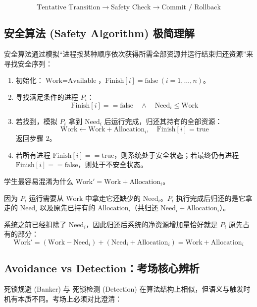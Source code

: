 \documentclass[11pt,a4paper]{ctexart}
\begin{document}
\[
\boxed{
\text{Tentative Transition}
\rightarrow
\text{Safety Check}
\rightarrow
\text{Commit / Rollback}
}
\]

\subsection{安全算法 (Safety Algorithm) 极简理解}

安全算法通过模拟“进程按某种顺序依次获得所需全部资源并运行结束归还资源”来寻找安全序列：

\begin{enumerate}
\item 初始化：$\text{Work} = \text{Available}$，$\text{Finish}[i] = \text{false} \ (i=1,\dots,n)$。
\item 寻找满足条件的进程 $P_i$：
\[
\text{Finish}[i] == \text{false} \quad \land \quad \text{Need}_i \le \text{Work}
\]
\item 若找到，模拟 $P_i$ 拿到 $\text{Need}_i$ 后运行完成，归还其持有的全部资源：
\[
\text{Work} \leftarrow \text{Work} + \text{Allocation}_i, \quad \text{Finish}[i] = \text{true}
\]
返回步骤 2。
\item 若所有进程 $\text{Finish}[i] == \text{true}$，则系统处于安全状态；若最终仍有进程 $\text{Finish}[i] == \text{false}$，则处于不安全状态。
\end{enumerate}

\begin{corebox}
学生最容易混淆为什么 $\text{Work}' = \text{Work} + \text{Allocation}_i$。

因为 $P_i$ 运行需要从 $\text{Work}$ 中拿走它还缺少的 $\text{Need}_i$。$P_i$ 执行完成后归还的是它拿走的 $\text{Need}_i$ 以及原先已持有的 $\text{Allocation}_i$（共归还 $\text{Need}_i + \text{Allocation}_i$）。

系统之前已经扣除了 $\text{Need}_i$，因此归还后系统的净资源增加量恰好就是 $P_i$ 原先占有的部分：
\[
\boxed{\text{Work}' = (\text{Work} - \text{Need}_i) + (\text{Need}_i + \text{Allocation}_i) = \text{Work} + \text{Allocation}_i}
\]
\end{corebox}

\subsection{Avoidance vs Detection：考场核心辨析}

死锁规避 (Banker) 与 死锁检测 (Detection) 在算法结构上相似，但语义与触发时机有本质不同。考场上必须对比澄清：
\end{document}
